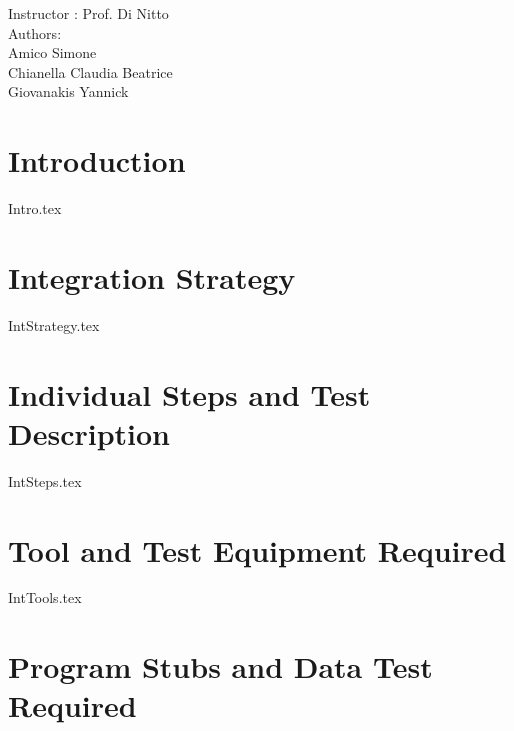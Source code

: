 \documentclass[12pt]{article}
\begin{document}
	\begin{center}
	 	{\Large Instructor : Prof. Di Nitto}
	 	 \vspace{5mm}\\	 
	 	{\Large Authors:}\\
	 	{\Large Amico Simone}\\
	 	{\Large Chianella Claudia Beatrice}\\
	 	{\Large Giovanakis Yannick}
	\end{center}
	 
	\newpage
	
	
	\tableofcontents{}
	 
	\newpage
		
	
	\section{Introduction}
	{Intro.tex}
	\newpage
	
	\section{Integration Strategy}
	{IntStrategy.tex}
	\newpage
	\section{Individual Steps and Test Description}
	\label{sec:IndSteps}
	{IntSteps.tex}	
	\newpage
	
	\section{Tool and Test Equipment Required}
	
	{IntTools.tex}	
	
	\section{Program Stubs and Data Test Required}

			
\end{document}
